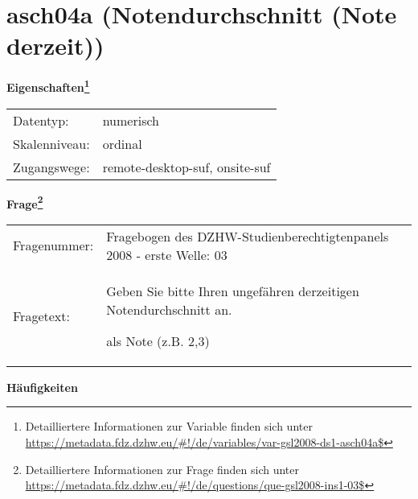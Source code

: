 
    \setcounter{footnote}{0}

    \vspace*{-1.8cm}
	\section{asch04a (Notendurchschnitt (Note derzeit))}
	\label{section:asch04a}



    \vspace*{0.5cm}
    \noindent\textbf{Eigenschaften\footnote{Detailliertere Informationen zur Variable finden sich unter
		\url{https://metadata.fdz.dzhw.eu/\#!/de/variables/var-gsl2008-ds1-asch04a$}}}\\
	\begin{tabularx}{\hsize}{@{}lX}
	Datentyp: & numerisch \\
	Skalenniveau: & ordinal \\
	Zugangswege: &
	  remote-desktop-suf, 
	  onsite-suf
 \\
    \end{tabularx}



				\vspace*{0.5cm}
                \noindent\textbf{Frage\footnote{Detailliertere Informationen zur Frage finden sich unter
		              \url{https://metadata.fdz.dzhw.eu/\#!/de/questions/que-gsl2008-ins1-03$}}}\\
				\begin{tabularx}{\hsize}{@{}lX}
					Fragenummer: &
					  Fragebogen des DZHW-Studienberechtigtenpanels 2008 - erste Welle:
					  03
 \\
					Fragetext: & Geben Sie bitte Ihren ungefähren derzeitigen Notendurchschnitt an.\par  als Note (z.B. 2,3) \\
				\end{tabularx}





        		\vspace*{0.5cm}
                \noindent\textbf{Häufigkeiten}

